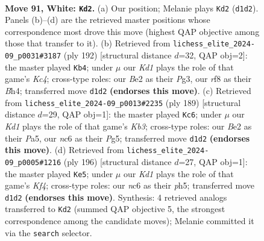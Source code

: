 \documentclass[11pt]{article}
\begin{document}
\clearpage

\begin{figure}[p]\centering
\begin{subfigure}{0.46\textwidth}\centering
\resizebox{\linewidth}{!}{%
\newchessgame
\chessboard[
  setfen={5r2/3k4/P1n5/8/8/1R4PP/2P1B3/3K4 w - - 15 91},
  showmover=false,
  pgfstyle=straightmove, color=movearrow, markmove={d1-d2}
]}
\caption{}
\end{subfigure}\hfill
\begin{subfigure}{0.46\textwidth}\centering
\resizebox{\linewidth}{!}{%
\newchessgame
\chessboard[
  setfen={3R4/5k2/2b1r3/2P4p/2K4B/6P1/8/8 w - - 9 97},
  showmover=false,
  pgfstyle=straightmove, color=movearrow, markmove={c4-b4}
]}
\caption{}
\end{subfigure}
\\[4pt]
\begin{subfigure}{0.46\textwidth}\centering
\resizebox{\linewidth}{!}{%
\newchessgame
\chessboard[
  setfen={8/8/1k5p/pp4p1/1b6/8/K7/8 b - - 1 95},
  showmover=false,
  pgfstyle=straightmove, color=movearrow, markmove={b6-c6}
]}
\caption{}
\end{subfigure}\hfill
\begin{subfigure}{0.46\textwidth}\centering
\resizebox{\linewidth}{!}{%
\newchessgame
\chessboard[
  setfen={2r5/4k3/1R4P1/7p/4BK1P/8/8/8 w - - 1 99},
  showmover=false,
  pgfstyle=straightmove, color=movearrow, markmove={f4-e5}
]}
\caption{}
\end{subfigure}
\caption{\textbf{Move 91, White: \texttt{Kd2}.} (a) Our position; Melanie plays \texttt{Kd2} (\texttt{d1d2}). Panels (b)--(d) are the retrieved master positions whose correspondence most drove this move (highest QAP objective among those that transfer to it). (b) Retrieved from \texttt{lichess\_elite\_2024-09\_p0031\#3187} (ply 192) [structural distance $d$=32, QAP obj=2]: the master played \texttt{Kb4}; under $\mu$ our \emph{Kd1} plays the role of that game's \emph{Kc4}; cross-type roles: our \emph{B}e2 as their \emph{P}g3, our \emph{r}f8 as their \emph{B}h4; transferred move \texttt{d1d2} \textbf{(endorses this move)}. (c) Retrieved from \texttt{lichess\_elite\_2024-09\_p0013\#2235} (ply 189) [structural distance $d$=29, QAP obj=1]: the master played \texttt{Kc6}; under $\mu$ our \emph{Kd1} plays the role of that game's \emph{Kb3}; cross-type roles: our \emph{B}e2 as their \emph{P}a5, our \emph{n}c6 as their \emph{P}g5; transferred move \texttt{d1d2} \textbf{(endorses this move)}. (d) Retrieved from \texttt{lichess\_elite\_2024-09\_p0005\#1216} (ply 196) [structural distance $d$=27, QAP obj=1]: the master played \texttt{Ke5}; under $\mu$ our \emph{Kd1} plays the role of that game's \emph{Kf4}; cross-type roles: our \emph{n}c6 as their \emph{p}h5; transferred move \texttt{d1d2} \textbf{(endorses this move)}. Synthesis: 4 retrieved analogs transferred to \texttt{Kd2} (summed QAP objective 5, the strongest correspondence among the candidate moves); Melanie committed it via the \texttt{search} selector.}
\label{fig:thought-m180}
\end{figure}
\end{document}
